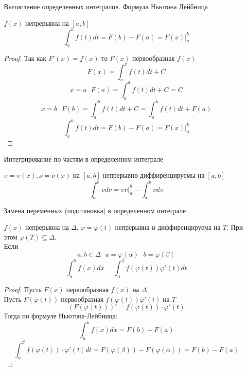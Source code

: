 \begin{title}[\Large]
  Вычисление определенных интегралов. Формула Ньютона Лейбница
\end{title}

\begin{theorem}
  $f(x)$ непрерывна на $[a, b]$
  \[\int^b_a f(t)dt = F(b) - F(a) = F(x)|^b_a\]
\end{theorem}

\begin{proof}
  Так как $F'(x) = f(x)$ то $F(x)$ первообразная $f(x)$
  \[F (x) = \int^x_a f(t)dt + C\]
  \[x = a ~~~ F (a) = \int^a_a f(t)dt + C = C\]
  \[x = b ~~~ F (b) = \int^b_a f(t)dt + C = \int^b_a f(t)dt + F(a)\]
  \[\int^b_a f(t)dt = F(b) - F(a) = F(x)|^b_a\]
\end{proof}

\begin{title}[\Large]
  Интегрирование по частям в определенном интеграле
\end{title}

\begin{theorem}
  $\upsilon = \upsilon (x), \nu = \nu(x)$ на $[a,b]$ непрерывно
  диффиренцируемы на $[a,b]$
  \[
    \int_a^b \upsilon d\nu = \upsilon \nu |_a^b - \int_a^b \nu d\upsilon
  \]
\end{theorem}

\begin{title}[\Large]
  Замена переменных (подстановка) в определенном интеграле
\end{title}

\begin{theorem}
  $f(x)$ непрерывна на $\Delta$, $x = \varphi (t)$ непрерывна и
  диффиренцируема на $T$. При этом $\varphi (T) \subseteq \Delta$.\\
  Если
  \[a, b \in \Delta ~~~ a = \varphi (\alpha) ~~~ b = \varphi (\beta)\]
  \[\int^b_a f(x)dx = \int^{\beta}_{\alpha} f(\varphi (t)) \varphi' (t)dt\]
\end{theorem}

\begin{proof}
  Пусть $F(x)$ первообразная $f(x)$ на $\Delta$\\
  Пусть $F(\varphi(t))$ первообразная $f(\varphi(t))\varphi'(t)$ на $T$\\
  \[
    (F(\varphi (t)))' = f(\varphi(t)) \cdot \varphi'(t)
  \]
  Тогда по формуле Ньютона-Лейбница:
  \[\int^b_a f(x)dx = F(b) - F(a)\]
  \[
    \int^{\beta}_{\alpha} f(\varphi (t)) \cdot \varphi' (t)dt =
    F(\varphi (\beta)) - F(\varphi (\alpha)) = F(b) - F(a)
  \]
\end{proof}

